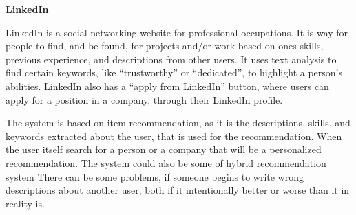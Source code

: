 \textbf{LinkedIn}

LinkedIn is a social networking website for professional occupations. It is way for people to find, and be found, for projects and/or work based on ones skills, previous experience, and descriptions from other users. It uses text analysis to find certain keywords, like “trustworthy” or “dedicated”, to highlight a person's abilities. LinkedIn also has a “apply from LinkedIn” button, where users can apply for a position in a company, through their LinkedIn profile. 

The system is based on item recommendation, as it is the descriptions, skills, and keywords extracted about the user, that is used for the recommendation. When the user itself search for a person or a company that will be a personalized recommendation. The system could also be some of hybrid recommendation system There can be some problems, if someone begins to write wrong descriptions about another user, both if it intentionally better or worse than it in reality is.